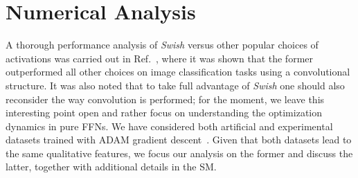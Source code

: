\documentclass[5p]{elsarticle}
\begin{document}
\section{Numerical Analysis}
%
A thorough performance analysis of {\it Swish} versus other popular choices of activations was carried out in Ref.~\cite{prajit}, where it was shown that the former outperformed all other choices on image classification tasks using a convolutional structure. It was also noted that to take full advantage of {\it Swish} one should also reconsider the way convolution is performed; for the moment, we leave this interesting point open and rather focus on understanding the optimization dynamics in pure FFNs.  We have considered both artificial and experimental datasets trained with ADAM gradient descent~\cite{adam}. Given that both datasets lead to the same qualitative features, we focus our analysis on the former and discuss the latter, together with additional details in the SM.
\end{document}
